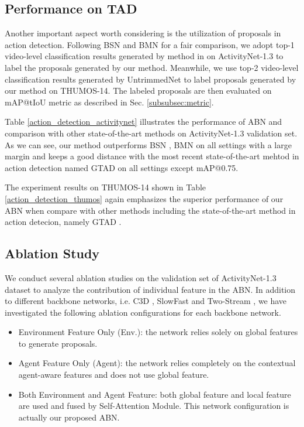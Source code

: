 \documentclass{ieeeaccess}
\begin{document}
\subsection{Performance on TAD}
Another important aspect worth considering is the utilization of proposals in action detection. Following BSN \cite{lin2018bsn} and BMN \cite{bmn} for a fair comparison, we adopt top-1 video-level classification results generated by method in \cite{action_protocol} on ActivityNet-1.3 to label the proposals generated by our method. Meanwhile, we use top-2 video-level classification results generated by UntrimmedNet \cite{untrimmetNet} to label proposals generated by our method on THUMOS-14. The labeled proposals are then evaluated on mAP@tIoU metric as described in Sec. \ref{subsubsec:metric}.

Table \ref{action_detection_activitynet} illustrates the performance of ABN and comparison with other state-of-the-art methods on ActivityNet-1.3 validation set. As we can see, our method outperforms BSN \cite{lin2018bsn}, BMN \cite{bmn} on all settings with a large margin and keeps a good distance with the most recent state-of-the-art mehtod in action detection named GTAD \cite{xu2020gtad} on all settings except mAP@0.75.

The experiment results on THUMOS-14 shown in Table \ref{action_detection_thumos} again emphasizes the superior performance of our ABN when compare with other methods including the state-of-the-art method in action detecion, namely GTAD \cite{xu2020gtad}.


\subsection{Ablation Study}

We conduct several ablation studies on the validation set of ActivityNet-1.3 dataset to analyze the contribution of individual feature in the ABN. In addition to different backbone networks, i.e. C3D \cite{C3D_3}, SlowFast \cite{SlowFast} and Two-Stream \cite{2_stream_2}, we have investigated the following ablation configurations for each backbone network.
\begin{itemize}
    \item Environment Feature Only (Env.): the network relies solely on global features to generate proposals.
    \item Agent Feature Only (Agent): the network relies completely on the contextual agent-aware features and does not use global feature.
    \item Both Environment and Agent Feature: both global feature and local feature are used and fused by Self-Attention Module. This network configuration is actually our proposed ABN.
\end{itemize}
\end{document}
